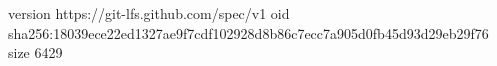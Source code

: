 version https://git-lfs.github.com/spec/v1
oid sha256:18039ece22ed1327ae9f7cdf102928d8b86c7ecc7a905d0fb45d93d29eb29f76
size 6429
